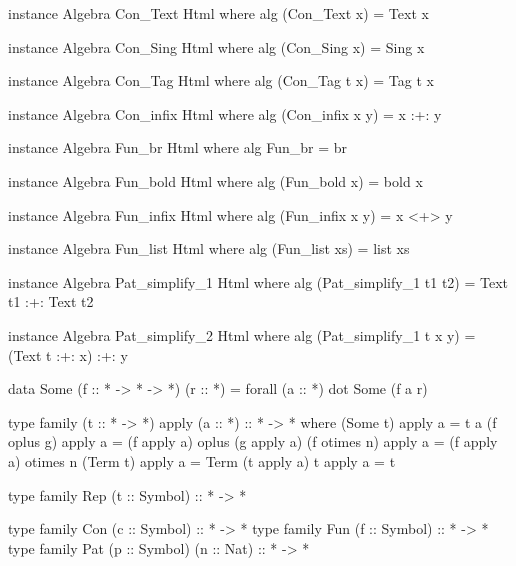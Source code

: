 \begin{code}
instance Algebra Con_Text Html where
  alg (Con_Text x) = Text x

instance Algebra Con_Sing Html where
  alg (Con_Sing x) = Sing x

instance Algebra Con_Tag Html where
  alg (Con_Tag t x) = Tag t x

instance Algebra Con_infix Html where
  alg (Con_infix x y) = x :+: y
\end{code}

\begin{code}
instance Algebra Fun_br Html where
  alg Fun_br = br

instance Algebra Fun_bold Html where
  alg (Fun_bold x) = bold x

instance Algebra Fun_infix Html where
  alg (Fun_infix x y) = x <+> y

instance Algebra Fun_list Html where
  alg (Fun_list xs) = list xs
\end{code}

\begin{code}
instance Algebra Pat_simplify_1 Html where
  alg (Pat_simplify_1 t1 t2) = Text t1 :+: Text t2

instance Algebra Pat_simplify_2 Html where
  alg (Pat_simplify_1 t x y) = (Text t :+: x) :+: y
\end{code}


\begin{code}
data Some (f :: * -> * -> *) (r :: *) = forall (a :: *) dot Some (f a r)
\end{code}

\begin{code}
type family (t :: * -> *) apply (a :: *) :: * -> *  where
  (Some t)      apply  a  = t a
  (f oplus g)   apply  a  = (f apply a) oplus (g apply a)
  (f otimes n)  apply  a  = (f apply a) otimes n
  (Term t)      apply  a  = Term (t apply a)
  t             apply  a  = t
\end{code}

\begin{code}
type family Rep (t :: Symbol) :: * -> *

type family Con (c :: Symbol) :: * -> *
type family Fun (f :: Symbol) :: * -> *
type family Pat (p :: Symbol) (n :: Nat) :: * -> *
\end{code}
